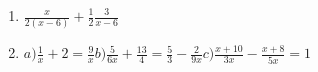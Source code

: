 

\begin{enumerate}
\item $\frac{x}{2\left(x-6\right)}+\frac{1}{2}	 	\frac{3}{x-6}  $
\item $	a)	\frac{1}{x}+2=\frac{9}{x}	b)	\frac{5}{6x}+\frac{13}{4}=\frac{5}{3}-\frac{2}{9x}	c)	\frac{x+10}{3x}-\frac{x+8}{5x}=1$

\end{enumerate}